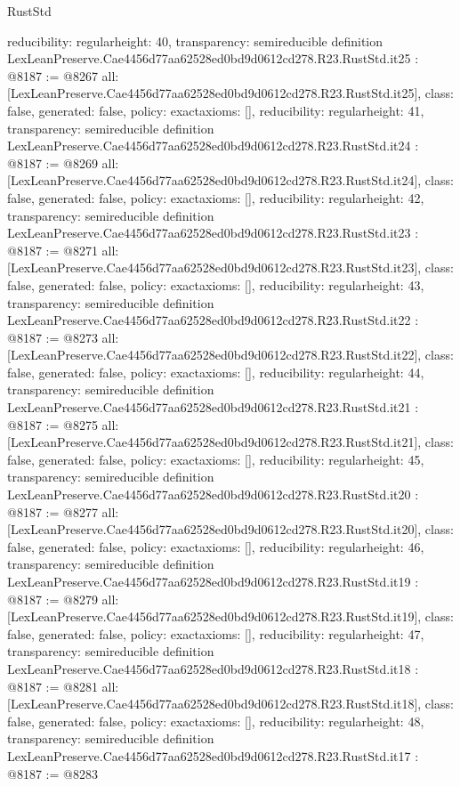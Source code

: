 \begin{lexlean}{RustStd}
\begin{coremodule}
{  reducibility: regular{height: 40},
  transparency: semireducible
}
definition LexLeanPreserve.Cae4456d77aa62528ed0bd9d0612cd278.R23.RustStd.it25 : @8187 := @8267 {
  all: [LexLeanPreserve.Cae4456d77aa62528ed0bd9d0612cd278.R23.RustStd.it25],
  class: false,
  generated: false,
  policy: exact{axioms: []},
  reducibility: regular{height: 41},
  transparency: semireducible
}
definition LexLeanPreserve.Cae4456d77aa62528ed0bd9d0612cd278.R23.RustStd.it24 : @8187 := @8269 {
  all: [LexLeanPreserve.Cae4456d77aa62528ed0bd9d0612cd278.R23.RustStd.it24],
  class: false,
  generated: false,
  policy: exact{axioms: []},
  reducibility: regular{height: 42},
  transparency: semireducible
}
definition LexLeanPreserve.Cae4456d77aa62528ed0bd9d0612cd278.R23.RustStd.it23 : @8187 := @8271 {
  all: [LexLeanPreserve.Cae4456d77aa62528ed0bd9d0612cd278.R23.RustStd.it23],
  class: false,
  generated: false,
  policy: exact{axioms: []},
  reducibility: regular{height: 43},
  transparency: semireducible
}
definition LexLeanPreserve.Cae4456d77aa62528ed0bd9d0612cd278.R23.RustStd.it22 : @8187 := @8273 {
  all: [LexLeanPreserve.Cae4456d77aa62528ed0bd9d0612cd278.R23.RustStd.it22],
  class: false,
  generated: false,
  policy: exact{axioms: []},
  reducibility: regular{height: 44},
  transparency: semireducible
}
definition LexLeanPreserve.Cae4456d77aa62528ed0bd9d0612cd278.R23.RustStd.it21 : @8187 := @8275 {
  all: [LexLeanPreserve.Cae4456d77aa62528ed0bd9d0612cd278.R23.RustStd.it21],
  class: false,
  generated: false,
  policy: exact{axioms: []},
  reducibility: regular{height: 45},
  transparency: semireducible
}
definition LexLeanPreserve.Cae4456d77aa62528ed0bd9d0612cd278.R23.RustStd.it20 : @8187 := @8277 {
  all: [LexLeanPreserve.Cae4456d77aa62528ed0bd9d0612cd278.R23.RustStd.it20],
  class: false,
  generated: false,
  policy: exact{axioms: []},
  reducibility: regular{height: 46},
  transparency: semireducible
}
definition LexLeanPreserve.Cae4456d77aa62528ed0bd9d0612cd278.R23.RustStd.it19 : @8187 := @8279 {
  all: [LexLeanPreserve.Cae4456d77aa62528ed0bd9d0612cd278.R23.RustStd.it19],
  class: false,
  generated: false,
  policy: exact{axioms: []},
  reducibility: regular{height: 47},
  transparency: semireducible
}
definition LexLeanPreserve.Cae4456d77aa62528ed0bd9d0612cd278.R23.RustStd.it18 : @8187 := @8281 {
  all: [LexLeanPreserve.Cae4456d77aa62528ed0bd9d0612cd278.R23.RustStd.it18],
  class: false,
  generated: false,
  policy: exact{axioms: []},
  reducibility: regular{height: 48},
  transparency: semireducible
}
definition LexLeanPreserve.Cae4456d77aa62528ed0bd9d0612cd278.R23.RustStd.it17 : @8187 := @8283 {
}
\end{coremodule}
\end{lexlean}
